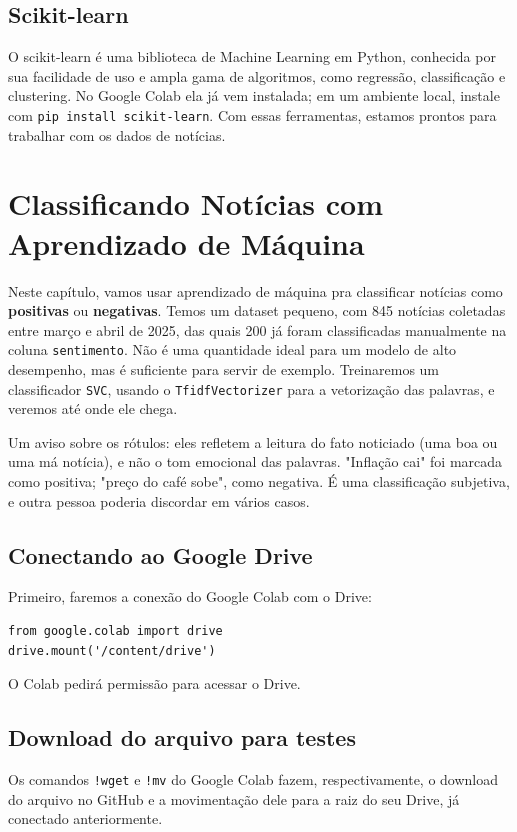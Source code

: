 \documentclass[a4paper,12pt,openany]{book}
\begin{document}
\subsection{Scikit-learn}
O scikit-learn é uma biblioteca de Machine Learning em Python, conhecida por sua facilidade de uso e ampla gama de algoritmos, como regressão, classificação e clustering. No Google Colab ela já vem instalada; em um ambiente local, instale com \texttt{pip install scikit-learn}. Com essas ferramentas, estamos prontos para trabalhar com os dados de notícias.

\section{Classificando Notícias com Aprendizado de Máquina}
Neste capítulo, vamos usar aprendizado de máquina pra classificar notícias como \textbf{positivas} ou \textbf{negativas}. Temos um dataset pequeno, com 845 notícias coletadas entre março e abril de 2025, das quais 200 já foram classificadas manualmente na coluna \texttt{sentimento}. Não é uma quantidade ideal para um modelo de alto desempenho, mas é suficiente para servir de exemplo. Treinaremos um classificador \texttt{SVC}, usando o \texttt{TfidfVectorizer} para a vetorização das palavras, e veremos até onde ele chega.

Um aviso sobre os rótulos: eles refletem a leitura do fato noticiado (uma boa ou uma má notícia), e não o tom emocional das palavras. "Inflação cai" foi marcada como positiva; "preço do café sobe", como negativa. É uma classificação subjetiva, e outra pessoa poderia discordar em vários casos.

\subsection{Conectando ao Google Drive}
Primeiro, faremos a conexão do Google Colab com o Drive:

\begin{verbatim}
from google.colab import drive
drive.mount('/content/drive')  
\end{verbatim}
O Colab pedirá permissão para acessar o Drive.

\subsection{Download do arquivo para testes}
Os comandos \texttt{!wget} e \texttt{!mv} do Google Colab fazem, respectivamente, o download do arquivo no GitHub e a movimentação dele para a raiz do seu Drive, já conectado anteriormente.
\end{document}
